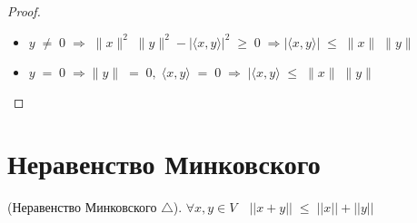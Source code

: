 \begin{proof}
\begin{enumerate}
        \begin{itemize}
        
        \vspace{0.4cm} \item $y \; \neq \; 0 \; \Longrightarrow \; \|x\|^2 \; \|y\|^2 - |\langle x, y \rangle|^2 \; \geq \; 0 \; \Longrightarrow |\langle x, y \rangle| \; \leq \; \|x\| \; \|y\|$
        
        \vspace{0.4cm} \item $y \; = \; 0 \; \Longrightarrow \|y\| \; = \; 0, \; \langle x, y \rangle \; = \; 0 \; \Longrightarrow \; |\langle x, y \rangle \; \leq \; \|x\| \; \|y\|$
        \end{itemize}
    \end{enumerate}
\end{proof}

\clearpage
\section{Неравенство Минковского}
\begin{shth}
    \begin{theorem}
        (Неравенство Минковского $\triangle$).
        \newline
        $\forall x,y \in V \quad ||x + y|| \; \leq \; ||x|| + ||y||$
    \end{theorem}
\end{shth}


